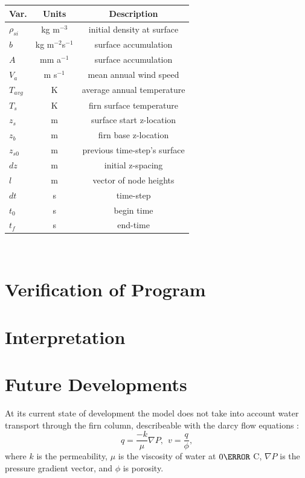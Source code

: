 \documentclass{article}%
\begin{document}
\footnotesize
\noindent\begin{tabular}{lcc}
\hline
Var. & Units & Description\\
\hline
$\rho_{si}$ & kg m$^{-3}$ & initial density at surface\\
$b$  & kg m$^{-2}$s$^{-1}$ & surface accumulation\\
$A$  & mm a$^{-1}$ & surface accumulation\\
$V_a$  & m s$^{-1}$ & mean annual wind speed\\
$T_{avg}$ & K & average annual temperature\\
$T_{s}$ & K & firn surface temperature\\
$z_s$ & m & surface start z-location\\
$z_b$ & m & firn base z-location\\
$z_{s0}$ & m & previous time-step's surface\\
$dz$ & m & initial z-spacing\\
$l$ & m & vector of node heights\\
$dt$ & s & time-step\\
$t_0$ & s & begin time\\
$t_f$ & s & end-time\\
\hline
\end{tabular}
\normalsize\\


\section{Verification of Program}


\section{Interpretation}

\section{Future Developments}

At its current state of development the model does not take into account water transport through the firn column, describeable with the darcy flow equations :
  $$
    q = \frac{-k}{\mu}\nabla P, \ \  v = \frac{q}{\phi},
  $$
where $k$ is the permeability, $\mu$ is the viscosity of water at $0\degree$ C, $\nabla P$ is the pressure gradient vector, and $\phi$ is porosity.
\end{document}
